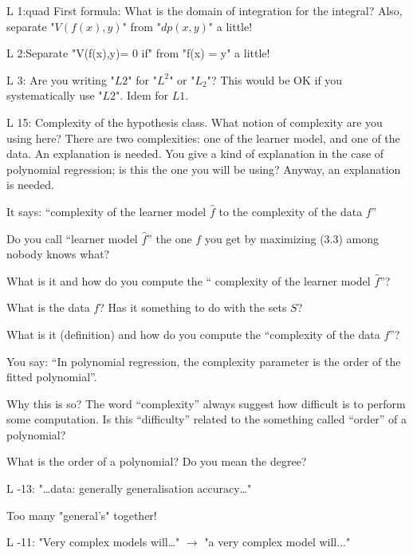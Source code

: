 \documentclass[12pt,reqno]{amsart}
\def\blue#1{{\color{blue} #1}}
\def\red#1{{\color{red} #1}}
\begin{document}
\begin{description}[style=unboxed,leftmargin=0cm,itemsep=3ex]

\blue{L 1:}quad 
First formula: What is the domain of integration for the integral? 
Also, separate "$V(f(x),y)$" from "$dp(x, y)$" a little!

\vspace{1ex}
\blue{L 2:}\quad Separate "V(f(x),y)= 0 if" from "f(x) = y" a little!

\vspace{1ex}
\blue{L  3:}\quad
Are you writing "$L2$" for "$L^2$" or "$L_2$"?
This would be OK if you systematically use "$L2$". Idem for $L1$.

\vspace{1ex}
\blue{L 15:}\quad
Complexity of the hypothesis class. 
What notion of complexity are you using here?
There are two complexities: one of the learner model, and one of the data.
An explanation is needed.
You give a kind of explanation in the case of polynomial regression; 
is this the one you will be using? 
Anyway, an explanation is needed.

It says: ``complexity of the learner model $\widehat{f}$ to the
complexity of the data $f$''

Do you call ``learner model $\widehat{f}$'' the one $f$ you get by
maximizing (3.3) among nobody knows what?

What is it and how do you compute the ``\red{complexity} of the
learner model $\widehat{f}$''?

What is the data $f$?
Has it something to do with the sets $S$?

What is it (definition) and how do you compute the 
``complexity of the data $f$''?

You say: ``In polynomial regression, the complexity parameter is
the order of the fitted polynomial''.

Why this is so?
The word ``complexity'' always suggest how difficult is to perform
some computation.
Is this ``difficulty'' related to the something called ``order''
of a polynomial?

What is the \red{order} of a polynomial?
Do you mean the \red{degree}?

\vspace{1ex}
\blue{L -13:}\quad
"\dots data: generally generalisation accuracy\dots"

Too many "general's" together!

\vspace{1ex}
\blue{L -11:}\quad
"Very complex models will\dots"
\quad$\longrightarrow$\quad
"a very complex model will..." 


\end{description}
\end{document}
